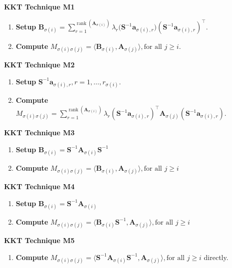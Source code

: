 {\begin{minipage}{0.8\textwidth}
		{\textbf{KKT Technique M1}}
\begin{enumerate}[leftmargin=25pt]
  \item {\textbf{Setup}} $\mathbf{B}_{\sigma (i)} = \sum_{r =
  1}^{\ensuremath{\operatorname{rank}} ( \mathbf{A}_{\sigma (i)} )} \lambda_r \big( \mathbf{S}^{- 1}
  \mathbf{a}_{\sigma (i), r} \big) ( \mathbf{S}^{- 1} \mathbf{a}_{\sigma (i), r})^{\top}$.
  
  \item {\textbf{Compute}} $M_{\sigma (i) \sigma (j)} = \langle
  \mathbf{B}_{\sigma (i)}, \mathbf{A}_{\sigma (j)} \rangle, \text{for all } j \geq i$.
\end{enumerate}
{\textbf{KKT Technique M2}}
\begin{enumerate}[leftmargin=25pt]
  \item {\textbf{Setup}} $\mathbf{S}^{- 1} \mathbf{a}_{\sigma (i), r}, r = 1, \ldots,
  r_{\sigma (i)}$.
  \item {\textbf{Compute}} $M_{\sigma (i) \sigma (j)} =  \sum_{r =
  1}^{\ensuremath{\operatorname{rank}} ( \mathbf{A}_{\sigma (i)} )} \lambda_r ( \mathbf{S}^{- 1}
  \mathbf{a}_{\sigma (i), r} )^{\top} \mathbf{A}_{\sigma (j)} ( \mathbf{S}^{- 1}
  \mathbf{a}_{\sigma (i), r} )$.
\end{enumerate}
{\textbf{KKT Technique M3}}
\begin{enumerate}[leftmargin=25pt]
  \item {\textbf{Setup}} $\mathbf{B}_{\sigma (i)} = \mathbf{S}^{- 1} \mathbf{A}_{\sigma
  (i)} \mathbf{S}^{- 1}$
  \item {\textbf{Compute}} $M_{\sigma (i) \sigma (j)} = \langle
  \mathbf{B}_{\sigma (i)}, \mathbf{A}_{\sigma (j)} \rangle, \text{for all } j \geq i$
\end{enumerate}

{\textbf{KKT Technique M4}}
\begin{enumerate}[leftmargin=25pt]
  \item {\textbf{Setup}} $\mathbf{B}_{\sigma (i)} = \mathbf{S}^{- 1} \mathbf{A}_{\sigma
  (i)}$
  
  \item {\textbf{Compute}} $M_{\sigma (i) \sigma (j)} = \langle
  \mathbf{B}_{\sigma (i)} \mathbf{S}^{- 1}, \mathbf{A}_{\sigma (j)} \rangle, \text{for all } j
  \geq i$
\end{enumerate}
{\textbf{KKT Technique M5}}
\begin{enumerate}[leftmargin=25pt]
  \item {\textbf{Compute}} $M_{\sigma (i) \sigma (j)} = \langle \mathbf{S}^{-
  1} \mathbf{A}_{\sigma (i)} \mathbf{S}^{- 1}, \mathbf{A}_{\sigma (j)} \rangle, \text{for all } j \geq
  i$ directly.
\end{enumerate}
\end{minipage}}

